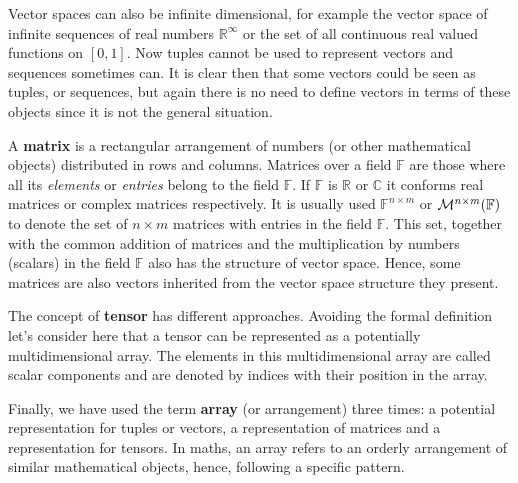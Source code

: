 Vector spaces can also be infinite dimensional, for example the vector space of infinite sequences of real numbers $\mathbb{R}^\infty$ or 
the set of all continuous real valued functions on $[0,1]$. Now tuples cannot be used to represent vectors and sequences sometimes can.
It is clear then that some vectors could be seen as tuples, or sequences, but again there is no need to define 
vectors in terms of these objects since it is not the general situation. 

A \textbf{matrix} is a rectangular arrangement of numbers (or other mathematical objects) distributed in rows and columns.
Matrices over a field $\mathbb{F}$ are those where all its \textit{elements} or \textit{entries} belong to the field $\mathbb{F}$.
If $\mathbb{F}$ is $\mathbb{R}$ or $\mathbb{C}$ it conforms real matrices or complex matrices respectively.
It is usually used $\mathbb{F}^{n\times m}$ or ${\cal{M}}^{n \times m} (\mathbb{F})$ to denote 
the set of $n\times m$ matrices with entries in the field $\mathbb{F}$. 
This set, together with the common addition of matrices and the multiplication by numbers (scalars) 
in the field $\mathbb{F}$ also has the structure of vector space. 
Hence, some matrices are also vectors inherited from the vector space structure they present.

The concept of \textbf{tensor} has different approaches. 
Avoiding the formal definition let's consider here that a tensor can be represented as a potentially multidimensional array.
The elements in this multidimensional array are called scalar components and are denoted by indices with their position in the array.

Finally, we have used the term \textbf{array} (or arrangement) three times: 
a potential representation for tuples or vectors, 
a representation of matrices and a representation for tensors. 
In maths, an array refers to an orderly arrangement of similar 
mathematical objects, hence, following a specific pattern.

